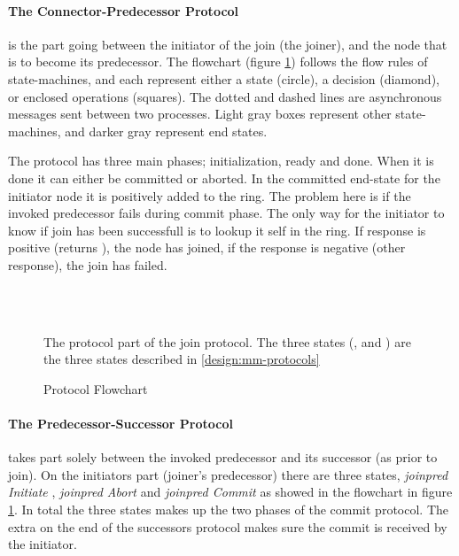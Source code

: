 \paragraph{The Connector-Predecessor  Protocol} is the part going between the
 initiator of the join (the joiner), and the node that is to become its predecessor. The
 flowchart (figure \ref{fig:joinpred}) follows the flow rules of state-machines, and each
  represent either a state (circle), a decision (diamond), or enclosed
 operations (squares). The dotted and dashed lines are asynchronous messages sent between
 two processes. Light gray boxes represent other state-machines, and darker gray represent
 end states.

The protocol has three main phases; initialization, ready and done. When it is done it
 can either be committed or aborted. In the committed end-state for the initiator node
 it is positively added to the ring. The problem here is if the invoked predecessor fails
 during commit phase. The only way for the initiator to know if join has been successfull
 is to lookup it self in the ring. If response is positive (returns ), the
 node has joined, if the response is negative (other response), the join has failed.

\begin{figure}[htp] %
\centering
{} \\\ \\
\parbox{.9\linewidth}{
  The  protocol part of the join protocol. The three states
  (,  and )
  are the three states described in \ref{design:mm-protocols}}
\caption{ Protocol Flowchart}
\label{fig:joinpred}
\end{figure}

\paragraph{The Predecessor-Successor  Protocol} takes part solely between
 the invoked predecessor and its successor (as prior to join).
 On the initiators part (joiner's predecessor) there are three
 states, \emph{joinpred Initiate} , \emph{joinpred Abort}  and
 \emph{joinpred Commit}  as
 showed in the flowchart in figure \ref{fig:joinpred}. In total the three states makes up
 the two phases of the commit protocol. The extra  on the end of the successors
 protocol makes sure the commit is received by the initiator.

